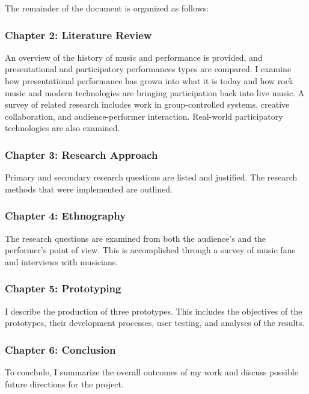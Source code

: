 The remainder of the document is organized as follows:

\subsubsection{Chapter 2: Literature Review}
	
An overview of the history of music and performance is provided, and presentational and participatory performances types are compared. I examine how presentational performance has grown into what it is today and how rock music and modern technologies are bringing participation back into live music. A survey of related research includes work in group-controlled systems, creative collaboration, and audience-performer interaction. Real-world participatory technologies are also examined.
	
\subsubsection{Chapter 3: Research Approach}
	
Primary and secondary research questions are listed and justified. The research methods that were implemented are outlined.
			
\subsubsection{Chapter 4: Ethnography}
	
The research questions are examined from both the audience's and the performer's point of view. This is accomplished through a survey of music fans and interviews with musicians.
	
\subsubsection{Chapter 5: Prototyping}

I describe the production of three prototypes. This includes the objectives of the prototypes, their development processes, user testing, and analyses of the results.
		
\subsubsection{Chapter 6: Conclusion}
	
To conclude, I summarize the overall outcomes of my work and discuss possible future directions for the project.